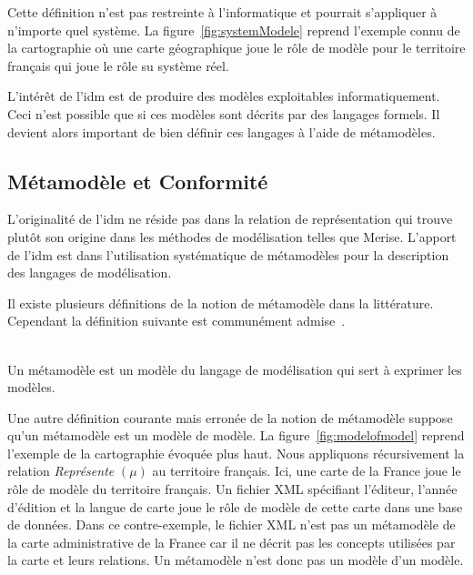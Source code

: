 Cette définition n'est pas restreinte à l'informatique et pourrait s'appliquer à 
n'importe quel système. 
La figure~\ref{fig:systemModele} reprend l'exemple connu de la cartographie où 
une carte géographique joue le rôle de modèle pour le territoire français qui joue le rôle su système réel.

L'intérêt de l'\gls{idm} est de produire des modèles exploitables informatiquement. 
Ceci n'est possible que si ces modèles sont décrits par des langages formels. Il 
devient alors important de bien définir ces langages à l'aide de métamodèles.

\subsection{Métamodèle et Conformité}
L'originalité de l'\gls{idm} ne réside pas dans la relation de représentation qui 
trouve plutôt son origine dans les méthodes de modélisation telles que Merise. L'apport de l'\gls{idm} est dans l'utilisation systématique de métamodèles pour la description des langages de modélisation. 

Il existe plusieurs définitions de la notion de métamodèle dans la littérature. 
Cependant la définition suivante est communément admise~\cite{bezivin2004rapport}.
\\\

\begin{definition}
Un métamodèle est un modèle du langage de modélisation qui sert à exprimer les 
modèles.
\end{definition}

Une autre définition courante mais erronée de la notion de métamodèle suppose
qu'un métamodèle est un modèle de modèle. La figure~\ref{fig:modelofmodel}
reprend l'exemple de la cartographie évoquée plus haut. Nous appliquons
récursivement la relation \textit{Représente} $(\mu)$ au territoire français.
Ici, une carte de la France joue le rôle de modèle du territoire français. Un
fichier XML spécifiant l'éditeur, l'année d'édition et la langue de carte joue
le rôle de modèle de cette carte dans une base de données. Dans ce
contre-exemple, le fichier XML n'est pas un métamodèle de la carte administrative de la France
car il ne décrit pas les concepts utilisées par la carte et leurs relations. Un
métamodèle n'est donc pas un modèle d'un modèle.

